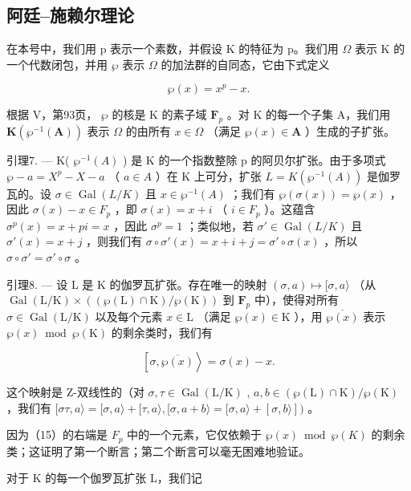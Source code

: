 \subsection{阿廷–施赖尔理论}

在本号中，我们用 p 表示一个素数，并假设 K 的特征为 p。我们用 \(\Omega\) 表示 K 的一个代数闭包，并用 \(\wp\) 表示 \(\Omega\) 的加法群的自同态，它由下式定义

\[
\wp (x) = x ^ {p} - x.
\]

根据 V，第93页， \(\wp\) 的核是 K 的素子域 \(\mathbf{F}_p\) 。对 K 的每一个子集 A，我们用 \(\mathbf{K}(\wp^{-1}(\mathbf{A}))\) 表示 \(\Omega\) 的由所有 \(x \in \Omega\) （满足 \(\wp(x) \in \mathbf{A}\) ）生成的子扩张。

引理7. --- K( \(\wp^{-1}(A)\) ) 是 K 的一个指数整除 p 的阿贝尔扩张。由于多项式 \(\wp - a = X^{p} - X - a\) （ \(a \in A\) ）在 K 上可分，扩张 \(L = K(\wp^{-1}(A))\) 是伽罗瓦的。设 \(\sigma \in \operatorname{Gal}(L/K)\) 且 \(x \in \wp^{-1}(A)\) ；我们有 \(\wp(\sigma(x)) = \wp(x)\) ，因此 \(\sigma(x) - x \in F_{p}\) ，即 \(\sigma(x) = x + i\) （ \(i \in F_{p}\) ）。这蕴含 \(\sigma^{p}(x) = x + pi = x\) ，因此 \(\sigma^{p} = 1\) ；类似地，若 \(\sigma' \in \operatorname{Gal}(L/K)\) 且 \(\sigma'(x) = x + j\) ，则我们有 \(\sigma \circ \sigma'(x) = x + i + j = \sigma' \circ \sigma(x)\) ，所以 \(\sigma \circ \sigma' = \sigma' \circ \sigma\) 。

引理8. --- 设 L 是 K 的伽罗瓦扩张。存在唯一的映射 \((\sigma, a) \mapsto [\sigma, a\rangle\) （从 \(\operatorname{Gal}(\mathrm{L} / \mathrm{K}) \times ((\wp(\mathrm{L}) \cap \mathrm{K}) / \wp(\mathrm{K}))\) 到 \(\mathbf{F}_p\) 中），使得对所有 \(\sigma \in \operatorname{Gal}(\mathrm{L} / \mathrm{K})\) 以及每个元素 \(x \in \mathrm{L}\) （满足 \(\wp(x) \in \mathrm{K}\) ），用 \(\overline{\wp(x)}\) 表示 \(\wp(x) \bmod \wp(\mathrm{K})\) 的剩余类时，我们有

\[
\left[ \sigma , \overline {{{\wp (x)}}} \right\rangle = \sigma (x) - x.\tag{15}
\]

这个映射是 Z-双线性的（对 \(\sigma, \tau \in \operatorname{Gal}(\mathrm{L} / \mathrm{K})\) , \(a, b \in (\wp(\mathrm{L}) \cap \mathrm{K}) / \wp(\mathrm{K})\) ，我们有 \([\sigma \tau, a\rangle = [\sigma, a\rangle + [\tau, a\rangle, [\sigma, a + b\rangle = [\sigma, a\rangle + [\sigma, b\rangle])\) 。

因为（15）的右端是 \(F_{p}\) 中的一个元素，它仅依赖于 \(\wp(x)\bmod\wp(K)\) 的剩余类；这证明了第一个断言；第二个断言可以毫无困难地验证。

对于 K 的每一个伽罗瓦扩张 L，我们记

